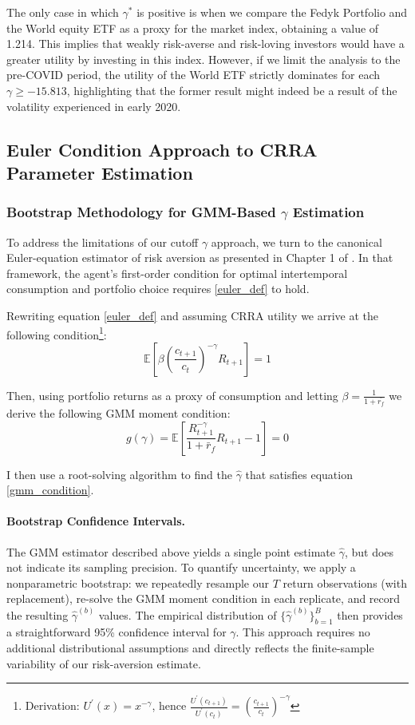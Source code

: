 The only case in which $\gamma^*$ is positive is when we compare the Fedyk Portfolio and the World equity ETF as a proxy for the market index, obtaining a value of 1.214.
This implies that weakly risk-averse and risk-loving investors would have a greater utility by investing in this index.
However, if we limit the analysis to the pre-COVID period, the utility of the World ETF strictly dominates for each $\gamma\geq-15.813$, 
highlighting that the former result might indeed be a result of the volatility experienced in early 2020.  

\subsection{Euler Condition Approach to CRRA Parameter Estimation}
\subsubsection{Bootstrap Methodology for GMM-Based $\gamma$ Estimation}
To address the limitations of our cutoff $\gamma$ approach, we turn to the canonical Euler-equation estimator of risk aversion as presented in Chapter 1 of \cite{Cochrane2005}.  
In that framework, the agent's first-order condition for optimal intertemporal consumption and portfolio choice requires \ref{euler_def} to hold.

Rewriting equation \ref{euler_def} and assuming CRRA utility we arrive at the following condition\footnote{Derivation:
$U^\prime(x)=x^{-\gamma}$, hence $\frac{U^\prime(c_{t+1})}{U^\prime(c_{t})}=\left(\frac{c_{t+1}}{c_t}\right)^{-\gamma}$}:
\begin{equation}
    \mathbb{E}\left[ \beta \left( \frac{c_{t+1}}{c_{t}} \right)^{-\gamma} R_{t+1} \right] = 1
\end{equation}  

Then, using portfolio returns as a proxy of consumption and letting $\beta = \frac{1}{1+\bar{r_f}}$ we derive the following GMM moment condition:
\begin{equation}
    g(\gamma) = \mathbb{E} \left[ \frac{R_{t+1}^{-\gamma}}{1+\bar{r}_f}  R_{t+1} - 1\right] = 0
    \label{gmm_condition}
\end{equation}  

I then use a root-solving algorithm to find the $\hat\gamma$ that satisfies equation \ref{gmm_condition}. 

\paragraph{Bootstrap Confidence Intervals.}
The GMM estimator described above yields a single point estimate $\hat\gamma$, but does not indicate its sampling precision.  
To quantify uncertainty, we apply a nonparametric bootstrap: we repeatedly resample our $T$ return observations (with replacement), re-solve the GMM moment condition in each replicate, and record the resulting $\hat\gamma^{(b)}$ values.  
The empirical distribution of $\{\hat\gamma^{(b)}\}_{b=1}^B$ then provides a straightforward 95\% confidence interval for $\gamma$.  
This approach requires no additional distributional assumptions and directly reflects the finite-sample variability of our risk-aversion estimate.

